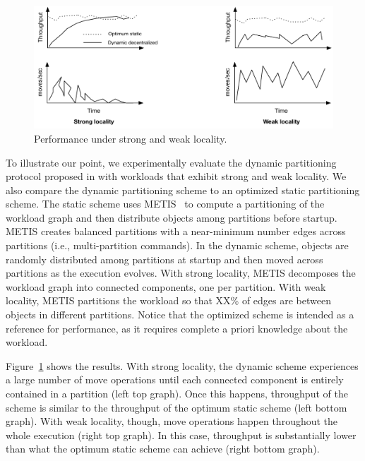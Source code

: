 \begin{figure}[ht]
	\center
	\includegraphics[width=0.6\linewidth]{figures/motivation}
	\caption{Performance under strong and weak locality.}
	\label{fig:motivation}
\end{figure}

To illustrate our point, we experimentally evaluate the dynamic partitioning protocol proposed in \cite{hoang2016} with workloads that exhibit strong and weak locality.
We also compare the dynamic partitioning scheme to an optimized static partitioning scheme.
The static scheme uses METIS~\cite{Abou-Rjeili:2006} to compute a partitioning of the workload graph and then distribute objects among partitions before startup.
METIS creates balanced partitions with a near-minimum number edges across partitions (i.e., multi-partition commands).
In the dynamic scheme, objects are randomly distributed among partitions at startup and then moved across partitions as the execution evolves.
With strong locality, METIS decomposes the workload graph into connected components, one per partition.
With weak locality, METIS partitions the workload so that XX\% of edges are between objects in different partitions.
Notice that the optimized scheme is intended as a reference for performance, as it requires complete a priori knowledge about the workload.

Figure~\ref{fig:motivation} shows the results.
With strong locality, the dynamic scheme experiences a large number of move operations until each connected component is entirely contained in a partition (left top graph).
Once this happens, throughput of the scheme is similar to the throughput of the optimum static scheme  (left bottom graph).
With weak locality, though, move operations happen throughout the whole execution (right top graph).
In this case, throughput is substantially lower than what the optimum static scheme can achieve (right bottom graph).

